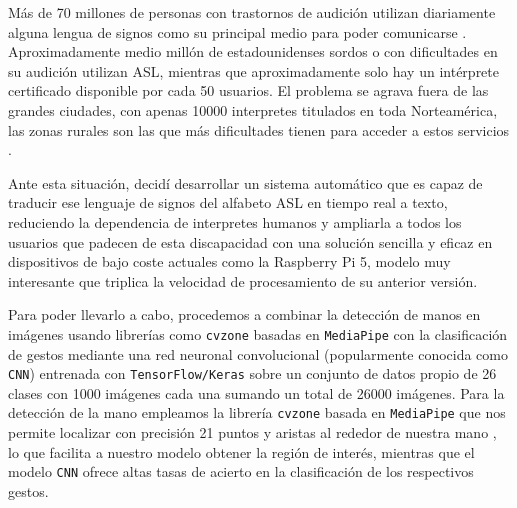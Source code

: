 

Más de 70 millones de personas con trastornos de audición utilizan diariamente alguna lengua de signos como su principal medio para poder comunicarse \cite{web:sign_languages_day}. Aproximadamente medio millón de estadounidenses sordos o con dificultades en su audición utilizan ASL, mientras que aproximadamente solo hay un intérprete certificado disponible por cada 50 usuarios. El problema se agrava fuera de las grandes ciudades, con apenas 10000 interpretes titulados en toda Norteamérica, las zonas rurales son las que más dificultades tienen para acceder a estos servicios \cite{web:shortage_asl}.


Ante esta situación, decidí desarrollar un sistema automático que es capaz de traducir ese lenguaje de signos del alfabeto ASL en tiempo real a texto, reduciendo la dependencia de interpretes humanos y ampliarla a todos los usuarios que padecen de esta discapacidad con una solución sencilla y eficaz en dispositivos de bajo coste actuales como la Raspberry Pi 5, modelo muy interesante que triplica la velocidad de procesamiento de su anterior versión\cite{art:raspberry_pi_5}.

Para poder llevarlo a cabo, procedemos a combinar la detección de manos en imágenes usando librerías como \texttt{cvzone} basadas en \texttt{MediaPipe} con la clasificación de gestos mediante una red neuronal convolucional (popularmente conocida como \texttt{CNN}) entrenada con \texttt{TensorFlow/Keras} sobre un conjunto de datos propio de 26 clases con 1000 imágenes cada una sumando un total de 26000 imágenes. Para la detección de la mano empleamos la librería \texttt{cvzone} basada en \texttt{MediaPipe} que nos permite localizar con precisión 21 puntos y aristas al rededor de nuestra mano \cite{web:hand_landmarker}, lo que facilita a nuestro modelo obtener la región de interés, mientras que el modelo \texttt{CNN} ofrece altas tasas de acierto en la clasificación de los respectivos gestos.

